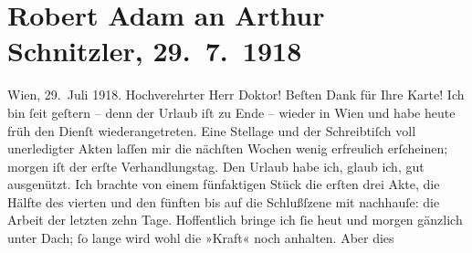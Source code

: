 

         
         \renewcommand{\erwaehntePersonen}{Personen:  Molière}
         \renewcommand{\erwaehnteOrte}{Orte: Andorf, Wien}
         \renewcommand{\erwaehnteWerke}{Werke: Robert, Yppl. Idylle in fünf Akten}
               \section[Robert Adam an Arthur Schnitzler, 29. 7. 1918]{ Robert Adam an Arthur Schnitzler, 29. 7. 1918}\nopagebreak{}\rehead{ }\begin{ledgroupsized}[t]{13cm}\normalsize\beginnumbering \toendnotes[C]{\smallbreak\pagebreak[2]} 
\toendnotes[C]{\smallbreak}\pstart
           \raggedleft{}{\pb}Wien, 29. Juli 1918.\pend
           \pstart\center{}Hochverehrter Herr Doktor!\pend\pstart
           Beſten Dank für Ihre Karte!\pend
           \pstart
           Ich bin ſeit geſtern – denn der Urlaub iſt zu Ende – wieder in Wien und habe heute früh den Dienſt wiederangetreten. Eine
                    Stellage und der Schreibtiſch voll unerledigter Akten laſſen mir die nächſten
                    Wochen wenig erfreulich erſcheinen; morgen iſt der erſte Verhandlungstag.\pend
           \pstart
           Den Urlaub habe ich, glaub ich, gut ausgenützt. Ich brachte von einem fünfaktigen
                        Stück die erſten drei
                    Akte, die Hälfte des vierten und den fünften bis auf die Schlußſzene mit
                    nachhauſe: die Arbeit der letzten zehn Tage. Hoffentlich bringe ich ſie heut und
                    morgen gänzlich unter Dach; ſo lange wird wohl die {\pb}»Kraft« noch anhalten. Aber dies

\end{ledgroupsized}
